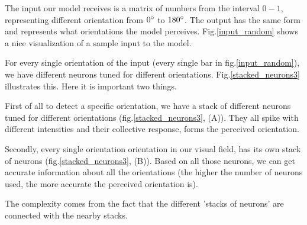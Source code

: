 The input our model receives is a matrix of numbers from the interval $0-1$, representing different orientation from $0\degree$ to $180\degree$. The output has the same form and represents what orientations the model perceives. Fig.\ref{input_random} shows a nice visualization of a sample input to the model.



For every single orientation of the input (every single bar in fig.\ref{input_random}), we have different neurons tuned for different orientations. Fig.\ref{stacked_neurons3} illustrates this. Here it is important two things. 

First of all to detect a specific orientation, we have a stack of different neurons tuned for different orientations (fig.\ref{stacked_neurons3}, (A)). They all spike with different intensities and their collective response, forms the perceived orientation. 

Secondly, every single orientation orientation in our visual field, has its own stack of neurons (fig.\ref{stacked_neurons3}, (B)). Based on all those neurons, we can get accurate information about all the orientations (the higher the number of neurons used, the more accurate the perceived orientation is).

The complexity comes from the fact that the different 'stacks of neurons' are connected with the nearby stacks. 


